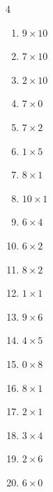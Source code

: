 \begin{multicols}{4}
\begin{enumerate}
  \item $9\times 10$
        \phantom{$=90$}

  \item $7\times 10$
        \phantom{$=70$}

  \item $2\times 10$
        \phantom{$=20$}

  \item $7\times 0$
        \phantom{$=0$}

  \item $7\times 2$
        \phantom{$=14$}

  \item $1\times 5$
        \phantom{$=5$}

  \item $8\times 1$
        \phantom{$=8$}

  \item $10\times 1$
        \phantom{$=10$}

  \item $6\times 4$
        \phantom{$=24$}

  \item $6\times 2$
        \phantom{$=12$}

  \item $8\times 2$
        \phantom{$=16$}

  \item $1\times 1$
        \phantom{$=1$}

  \item $9\times 6$
        \phantom{$=54$}

  \item $4\times 5$
        \phantom{$=20$}

\columnbreak %

\resetques

  \item $0\times 8$
        \phantom{$=0$}

  \item $8\times 1$
        \phantom{$=8$}

  \item $2\times 1$
        \phantom{$=2$}

  \item $3\times 4$
        \phantom{$=12$}

  \item $2\times 6$
        \phantom{$=12$}

  \item $6\times 0$
        \phantom{$=0$}


\end{enumerate}
\end{multicols}
